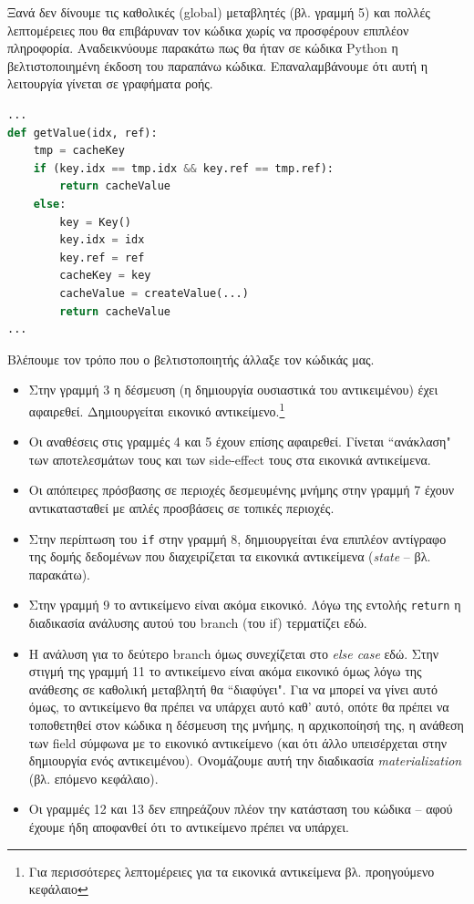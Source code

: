 Ξανά δεν δίνουμε τις καθολικές (global) μεταβλητές (βλ. γραμμή 5) και πολλές
λεπτομέρειες που θα επιβάρυναν τον κώδικα χωρίς να προσφέρουν επιπλέον
πληροφορία. Αναδεικνύουμε παρακάτω πως θα ήταν σε κώδικα Python η
βελτιστοποιημένη έκδοση του παραπάνω κώδικα. Επαναλαμβάνουμε ότι αυτή η
λειτουργία γίνεται σε γραφήματα ροής.

\begin{lstlisting}[language=Python]
...
def getValue(idx, ref):
    tmp = cacheKey
    if (key.idx == tmp.idx && key.ref == tmp.ref):
        return cacheValue
    else:
        key = Key()
        key.idx = idx
        key.ref = ref
        cacheKey = key
        cacheValue = createValue(...)
        return cacheValue
...
\end{lstlisting}

Βλέπουμε τον τρόπο που ο βελτιστοποιητής άλλαξε τον κώδικάς μας.

\begin{itemize}

\item Στην γραμμή 3 η δέσμευση (η δημιουργία ουσιαστικά του αντικειμένου) έχει
αφαιρεθεί. Δημιουργείται εικονικό αντικείμενο.\footnote{Για περισσότερες
λεπτομέρειες για τα εικονικά αντικείμενα βλ. προηγούμενο κεφάλαιο}

\item Οι αναθέσεις στις γραμμές 4 και 5 έχουν επίσης αφαιρεθεί. Γίνεται
``ανάκλαση" των αποτελεσμάτων τους και των side-effect τους στα εικονικά
αντικείμενα.

\item Οι απόπειρες πρόσβασης σε περιοχές δεσμευμένης μνήμης στην γραμμή 7 έχουν
αντικατασταθεί με απλές προσβάσεις σε τοπικές περιοχές.

\item Στην περίπτωση του \texttt{if} στην γραμμή 8, δημιουργείται ένα επιπλέον
αντίγραφο της δομής δεδομένων που διαχειρίζεται τα εικονικά αντικείμενα
(\textit{state} – βλ. παρακάτω).

\item Στην γραμμή 9 το αντικείμενο είναι ακόμα εικονικό. Λόγω της εντολής
\texttt{return} η διαδικασία ανάλυσης αυτού του branch (του if) τερματίζει εδώ.

\item Η ανάλυση για το δεύτερο branch όμως συνεχίζεται στο \textit{else case}
εδώ. Στην στιγμή της γραμμή 11 το αντικείμενο είναι ακόμα εικονικό όμως λόγω της
ανάθεσης σε καθολική μεταβλητή θα ``διαφύγει". Για να μπορεί να γίνει αυτό όμως,
το αντικείμενο θα πρέπει να υπάρχει αυτό καθ' αυτό, οπότε θα πρέπει να
τοποθετηθεί στον κώδικα η δέσμευση της μνήμης, η αρχικοποίησή της, η ανάθεση των
field σύμφωνα με το εικονικό αντικείμενο (και ότι άλλο υπεισέρχεται στην
δημιουργία ενός αντικειμένου). Ονομάζουμε αυτή την διαδικασία
\textit{materialization} (βλ. επόμενο κεφάλαιο).

\item Οι γραμμές 12 και 13 δεν επηρεάζουν πλέον την κατάσταση του κώδικα – αφού
έχουμε ήδη αποφανθεί ότι το αντικείμενο πρέπει να υπάρχει.

\end{itemize}

